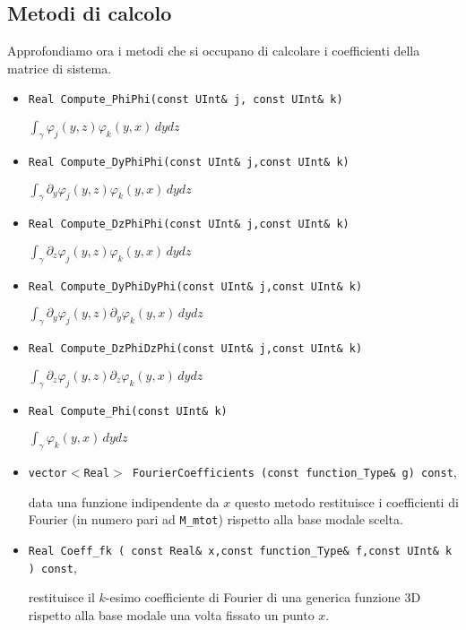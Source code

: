
\subsection{Metodi di calcolo}
Approfondiamo ora i metodi che si occupano di calcolare i coefficienti della matrice di sistema.

\begin{itemize}
\item \texttt{Real Compute\_PhiPhi(const UInt\& j, const UInt\& k)}

 $\int_{\gamma}\varphi_j(y,z)\varphi_k(y,x) \,dydz$

\item \texttt{Real Compute\_DyPhiPhi(const UInt\& j,const UInt\& k)} 

$\int_{\gamma} \partial_y \varphi_j(y,z)\varphi_k(y,x) \,dydz$

\item \texttt{Real Compute\_DzPhiPhi(const UInt\& j,const UInt\& k)} 

$\int_{\gamma} \partial_z \varphi_j(y,z)\varphi_k(y,x) \,dydz$

\item \texttt{Real Compute\_DyPhiDyPhi(const UInt\& j,const UInt\& k)} 

$\int_{\gamma} \partial_y \varphi_j(y,z)\partial_y\varphi_k(y,x) \,dydz$

\item \texttt{Real Compute\_DzPhiDzPhi(const UInt\& j,const UInt\& k)} 

$\int_{\gamma} \partial_z \varphi_j(y,z)\partial_z\varphi_k(y,x) \,dydz$

\item \texttt{Real Compute\_Phi(const UInt\& k)} 

$\int_{\gamma} \varphi_k(y,x) \,dydz$

\item \texttt{vector$<$Real$>$ FourierCoefficients (const function\_Type\& g) const},

data una funzione indipendente da $x$ questo metodo restituisce i coefficienti di Fourier (in numero pari ad \texttt{M\_mtot}) rispetto alla base modale scelta.

\item \texttt{Real Coeff\_fk (	const Real\& x,const function\_Type\& f,const UInt\& k ) const},

restituisce il $k$-esimo coefficiente di Fourier di una generica funzione 3D rispetto alla base modale una volta fissato un punto $x$.
\end{itemize}


